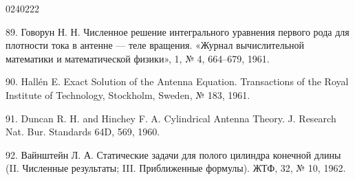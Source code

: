 \begin{scanpage}{0240}{222}
{89. Говорун Н. Н. Численное решение интегрального уравнения первого рода для плотности тока в антенне --- теле вращения. «Журнал вычислительной математики и математической физики», 1, № 4, 664--679, 1961.\par
90. Hallén E. Exact Solution of the Antenna Equation. Transactions of the Royal Institute of Technology, Stockholm, Sweden, № 183, 1961.\par
91. Duncan R. H. and Hinchey F. A. Cylindrical Antenna Theory. J. Research Nat. Bur. Standards 64D, 569, 1960.\par
92. Вайнштейн Л. А. Статические задачи для полого цилиндра конечной длины (II. Численные результаты; III. Приближенные формулы). ЖТФ, 32, № 10, 1962.\par}
\end{scanpage}

